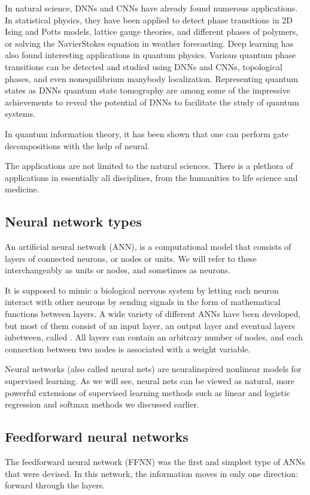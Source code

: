\documentclass[letterpaper,10pt,english]{sphinxmanual}
\begin{document}
In natural science, DNNs and CNNs have already found numerous
applications. In statistical physics, they have been applied to detect
phase transitions in 2D Ising and Potts models, lattice gauge
theories, and different phases of polymers, or solving the
Navier\sphinxhyphen{}Stokes equation in weather forecasting.  Deep learning has also
found interesting applications in quantum physics. Various quantum
phase transitions can be detected and studied using DNNs and CNNs,
topological phases, and even non\sphinxhyphen{}equilibrium many\sphinxhyphen{}body
localization. Representing quantum states as DNNs quantum state
tomography are among some of the impressive achievements to reveal the
potential of DNNs to facilitate the study of quantum systems.

In quantum information theory, it has been shown that one can perform
gate decompositions with the help of neural.

The applications are not limited to the natural sciences. There is a
plethora of applications in essentially all disciplines, from the
humanities to life science and medicine.


\subsection{Neural network types}
\label{\detokenize{chapter6:neural-network-types}}
An artificial neural network (ANN), is a computational model that
consists of layers of connected neurons, or nodes or units.  We will
refer to these interchangeably as units or nodes, and sometimes as
neurons.

It is supposed to mimic a biological nervous system by letting each
neuron interact with other neurons by sending signals in the form of
mathematical functions between layers.  A wide variety of different
ANNs have been developed, but most of them consist of an input layer,
an output layer and eventual layers in\sphinxhyphen{}between, called . All layers can contain an arbitrary number of nodes, and each
connection between two nodes is associated with a weight variable.

Neural networks (also called neural nets) are neural\sphinxhyphen{}inspired
nonlinear models for supervised learning.  As we will see, neural nets
can be viewed as natural, more powerful extensions of supervised
learning methods such as linear and logistic regression and soft\sphinxhyphen{}max
methods we discussed earlier.


\subsection{Feed\sphinxhyphen{}forward neural networks}
\label{\detokenize{chapter6:feed-forward-neural-networks}}
The feed\sphinxhyphen{}forward neural network (FFNN) was the first and simplest type
of ANNs that were devised. In this network, the information moves in
only one direction: forward through the layers.
\end{document}
